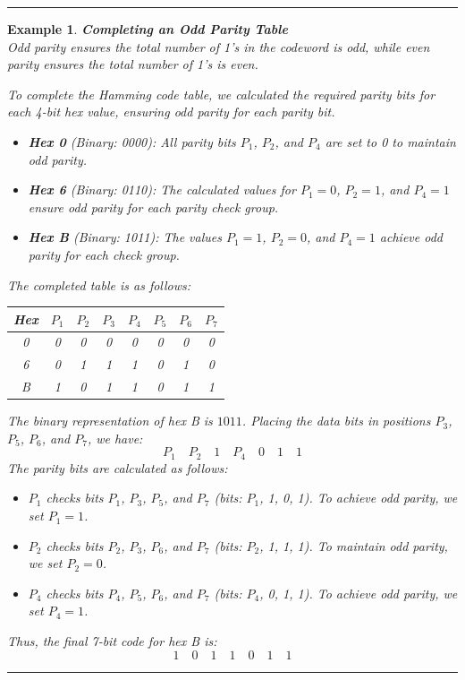 \documentclass[12pt]{article}
\newtheorem{example}{Example}
\newenvironment{examp}
{\vspace{0.5cm}
 \hrule
\vspace{0.5cm}
\begin{example}}
{\hrule
\vspace{0.5cm}
\end{example}}
\begin{document}
\begin{examp}
	\textbf{Completing an Odd Parity Table}\\
	Odd parity ensures the total number of 1's in the codeword is odd, while even parity ensures the total number of 1's is even.

	To complete the Hamming code table, we calculated the required parity bits for each 4-bit hex value, ensuring odd parity for each parity bit.

	\begin{itemize}
		\item \textbf{Hex 0} (Binary: 0000): All parity bits \( P_1 \), \( P_2 \), and \( P_4 \) are set to 0 to maintain odd parity.
		\item \textbf{Hex 6} (Binary: 0110): The calculated values for \( P_1 = 0 \), \( P_2 = 1 \), and \( P_4 = 1 \) ensure odd parity for each parity check group.
		\item \textbf{Hex B} (Binary: 1011): The values \( P_1 = 1 \), \( P_2 = 0 \), and \( P_4 = 1 \) achieve odd parity for each check group.
	\end{itemize}

	The completed table is as follows:

	\begin{center}
		\begin{tabular}{|c|c|c|c|c|c|c|c|}
			\hline
			\textbf{Hex} & \( P_1 \) & \( P_2 \) & \( P_3 \) & \( P_4 \) & \( P_5 \) & \( P_6 \) & \( P_7 \) \\
			\hline
			0            & 0         & 0         & 0         & 0         & 0         & 0         & 0         \\
			6            & 0         & 1         & 1         & 1         & 0         & 1         & 0         \\
			B            & 1         & 0         & 1         & 1         & 0         & 1         & 1         \\
			\hline
		\end{tabular}
	\end{center}
	The binary representation of hex B is \(1011\). Placing the data bits in positions \( P_3 \), \( P_5 \), \( P_6 \), and \( P_7 \), we have:
	\[
		P_1 \quad P_2 \quad 1 \quad P_4 \quad 0 \quad 1 \quad 1
	\]
	The parity bits are calculated as follows:
	\begin{itemize}
		\item \( P_1 \) checks bits \( P_1 \), \( P_3 \), \( P_5 \), and \( P_7 \) (bits: \( P_1 \), 1, 0, 1). To achieve odd parity, we set \( P_1 = 1 \).
		\item \( P_2 \) checks bits \( P_2 \), \( P_3 \), \( P_6 \), and \( P_7 \) (bits: \( P_2 \), 1, 1, 1). To maintain odd parity, we set \( P_2 = 0 \).
		\item \( P_4 \) checks bits \( P_4 \), \( P_5 \), \( P_6 \), and \( P_7 \) (bits: \( P_4 \), 0, 1, 1). To achieve odd parity, we set \( P_4 = 1 \).
	\end{itemize}

	Thus, the final 7-bit code for hex B is:
	\[
		1 \quad 0 \quad 1 \quad 1 \quad 0 \quad 1 \quad 1
	\]
\end{examp}
\end{document}
